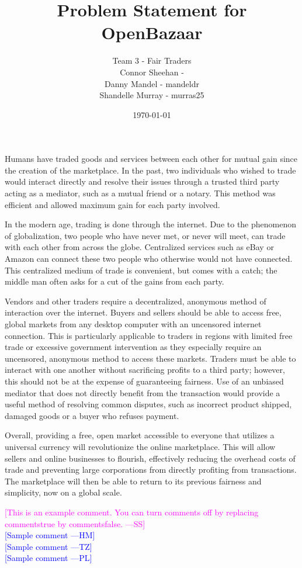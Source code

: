 \documentclass[12pt]{report}
\newcommand{\authornote}[3]{\textcolor{#1}{[#3 ---#2]}}
\newcommand{\authornote}[3]{}
\newcommand{\wss}[1]{\authornote{magenta}{SS}{#1}}
\newcommand{\hm}[1]{\authornote{blue}{HM}{#1}} %
\newcommand{\tz}[1]{\authornote{blue}{TZ}{#1}} %
\newcommand{\pl}[1]{\authornote{blue}{PL}{#1}} %
\begin{document}
\title{Problem Statement for OpenBazaar} 
\author{Team 3 - Fair Traders \\ Connor Sheehan - \\Danny Mandel - mandeldr \\ Shandelle Murray - murras25}
\date{\today}
	
\maketitle

Humans have traded goods and services between each other for mutual gain since the creation of the marketplace. In the past, two individuals who wished to trade would interact directly and resolve their issues through a trusted third party acting as a mediator, such as a mutual friend or a notary. This method was efficient and allowed maximum gain for each party involved. 
	
In the modern age, trading is done through the internet. Due to the phenomenon of globalization, two people who have never met, or never will meet, can trade with each other from across the globe. Centralized services such as eBay or Amazon can connect these two people who otherwise would not have connected. This centralized medium of trade is convenient, but comes with a catch; the middle man often asks for a cut of the gains from each party. 

Vendors and other traders require a decentralized, anonymous method of interaction over the internet. Buyers and sellers should be able to access free, global markets from any desktop computer with an uncensored internet connection. This is particularly applicable to traders in regions with limited free trade or excessive government intervention as they especially require an uncensored, anonymous method to access these markets. Traders must be able to interact with one another without sacrificing profits to a third party; however, this should not be at the expense of guaranteeing fairness. Use of an unbiased mediator that does not directly benefit from the transaction would provide a useful method of resolving common disputes, such as incorrect product shipped, damaged goods or a buyer who refuses payment.
	
Overall, providing a free, open market accessible to everyone that utilizes a universal currency will revolutionize the online marketplace. This will allow sellers and online businesses to flourish, effectively reducing the overhead costs of trade and preventing large corporations from directly profiting from transactions. The marketplace will then be able to return to its previous fairness and simplicity, now on a global scale.


\noindent \wss{This is an example comment.  You can turn comments off by replacing
  commentstrue by commentsfalse.}\\
\hm{Sample comment}\\
\tz{Sample comment}\\
\pl{Sample comment}
\end{document}
